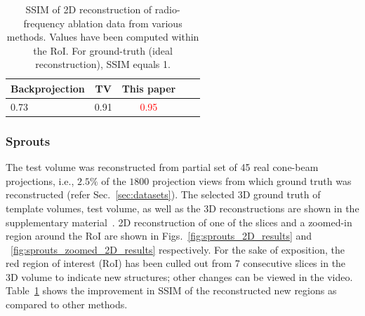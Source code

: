\documentclass[journal]{IEEEtran}
\begin{document}
\begin{table}[!h]
  \centering
  \caption{SSIM of 2D reconstruction of radio-frequency ablation data from various methods. Values have been computed within the RoI. For ground-truth (ideal reconstruction), SSIM equals 1.}
\begin{tabular}{|l|c|c|c|c|}
\hline \textbf{Backprojection} & \textbf{TV} &
\textbf{This paper} \\ \hline  0.73
& 0.91 & \textcolor{red}{0.95} \\ \hline 
\end{tabular}
\label{table:sprouts_ssim}
\end{table}



\subsubsection{\textbf{Sprouts}}
\label{Sec:sprouts_spatially_varying}

The test volume was reconstructed from partial set of 45 real
cone-beam projections, i.e., $2.5\%$ of the $1800$ projection views from
which ground truth was reconstructed (refer Sec.~\ref{sec:datasets}). The selected 3D ground truth of
template volumes, test volume, as well as the 3D reconstructions are
shown in the supplementary material~\cite{supp_paper}.  2D
reconstruction of one of the slices and a zoomed-in region around the
RoI are shown in Figs.~\ref{fig:sprouts_2D_results} and
~\ref{fig:sprouts_zoomed_2D_results} respectively. For the sake of
exposition, the red region of interest (RoI) has been culled out from
7 consecutive slices in the 3D volume to indicate new structures;
other changes can be viewed in the
video. Table~\ref{table:sprouts_ssim} shows the improvement in SSIM of
the reconstructed new regions as compared to other methods.
\end{document}

